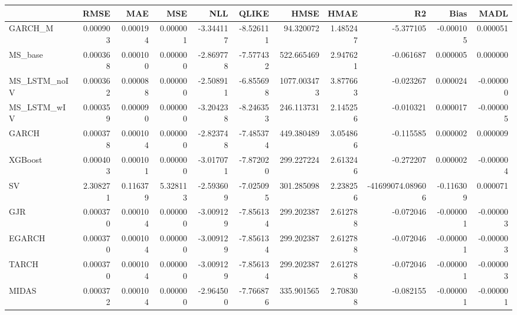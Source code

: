 \begin{tabular}{lrrrrrrrrrr}
\toprule
 & RMSE & MAE & MSE & NLL & QLIKE & HMSE & HMAE & R2 & Bias & MADL \\
\midrule
GARCH_M & 0.000903 & 0.000194 & 0.000001 & -3.344117 & -8.526111 & 94.320072 & 1.485247 & -5.377105 & -0.000105 & 0.000051 \\
MS_base & 0.000368 & 0.000100 & 0.000000 & -2.869778 & -7.577432 & 522.665469 & 2.947621 & -0.061687 & 0.000005 & 0.000000 \\
MS_LSTM_noIV & 0.000362 & 0.000088 & 0.000000 & -2.508911 & -6.855698 & 1077.003473 & 3.877663 & -0.023267 & 0.000024 & -0.000000 \\
MS_LSTM_wIV & 0.000359 & 0.000090 & 0.000000 & -3.204238 & -8.246353 & 246.113731 & 2.145256 & -0.010321 & 0.000017 & -0.000005 \\
GARCH & 0.000378 & 0.000104 & 0.000000 & -2.823748 & -7.485374 & 449.380489 & 3.054866 & -0.115585 & 0.000002 & 0.000009 \\
XGBoost & 0.000403 & 0.000101 & 0.000000 & -3.017071 & -7.872020 & 299.227224 & 2.613246 & -0.272207 & 0.000002 & -0.000004 \\
SV & 2.308271 & 0.116379 & 5.328113 & -2.593609 & -7.025095 & 301.285098 & 2.238256 & -41699074.089606 & -0.116309 & 0.000071 \\
GJR & 0.000370 & 0.000104 & 0.000000 & -3.009129 & -7.856134 & 299.202387 & 2.612788 & -0.072046 & -0.000001 & -0.000003 \\
EGARCH & 0.000370 & 0.000104 & 0.000000 & -3.009129 & -7.856134 & 299.202387 & 2.612788 & -0.072046 & -0.000001 & -0.000003 \\
TARCH & 0.000370 & 0.000104 & 0.000000 & -3.009129 & -7.856134 & 299.202387 & 2.612788 & -0.072046 & -0.000001 & -0.000003 \\
MIDAS & 0.000372 & 0.000104 & 0.000000 & -2.964500 & -7.766876 & 335.901565 & 2.708308 & -0.082155 & -0.000001 & -0.000001 \\
\bottomrule
\end{tabular}
